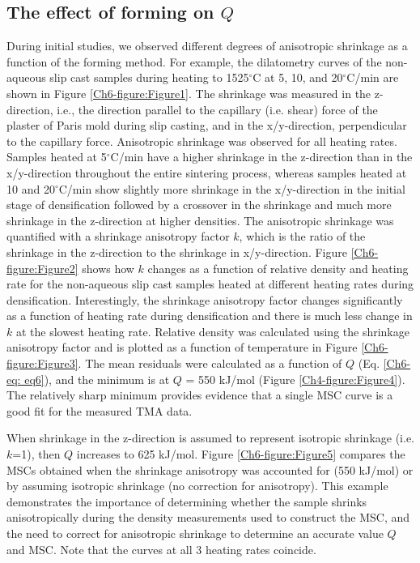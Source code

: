 \subsection{The effect of forming on $Q$}
During initial studies, we observed different degrees of anisotropic shrinkage as a function of the forming method. For example, the dilatometry curves of the non-aqueous slip cast samples during heating to 1525$^{\circ}$C at 5, 10, and 20$^{\circ}$C/min are shown in Figure \ref{Ch6-figure:Figure1}. The shrinkage was measured in the z-direction, i.e., the direction parallel to the capillary (i.e. shear) force of the plaster of Paris mold during slip casting, and in the x/y-direction, perpendicular to the capillary force. Anisotropic shrinkage was observed for all heating rates. Samples heated at 5$^{\circ}$C/min have a higher shrinkage in the z-direction than in the x/y-direction throughout the entire sintering process, whereas samples heated at 10 and 20$^{\circ}$C/min show slightly more shrinkage in the x/y-direction in the initial stage of densification followed by a crossover in the shrinkage and much more shrinkage in the z-direction at higher densities. The anisotropic shrinkage was quantified with a shrinkage anisotropy factor $k$, which is the ratio of the shrinkage in the z-direction to the shrinkage in x/y-direction. Figure \ref{Ch6-figure:Figure2} shows how $k$ changes as a function of relative density and heating rate for the non-aqueous slip cast samples heated at different heating rates during densification. Interestingly, the shrinkage anisotropy factor changes significantly as a function of heating rate during densification and there is much less change in $k$ at the slowest heating rate. Relative density was calculated using the shrinkage anisotropy factor and is plotted as a function of temperature in Figure \ref{Ch6-figure:Figure3}. The mean residuals were calculated as a function of $Q$ (Eq. \ref{Ch6-eq: eq6}), and the minimum is at $Q$ = 550 kJ/mol (Figure \ref{Ch4-figure:Figure4}). The relatively sharp minimum provides evidence that a single MSC curve is a good fit for the measured TMA data. 

When shrinkage in the z-direction is assumed to represent isotropic shrinkage (i.e. $k$=1), then $Q$ increases to 625 kJ/mol. Figure \ref{Ch6-figure:Figure5} compares the MSCs obtained when the shrinkage anisotropy was accounted for (550 kJ/mol) or by assuming isotropic shrinkage (no correction for anisotropy). This example demonstrates the importance of determining whether the sample shrinks anisotropically during the density measurements used to construct the MSC, and the need to correct for anisotropic shrinkage to determine an accurate value $Q$ and MSC. Note that the curves at all 3 heating rates coincide.

